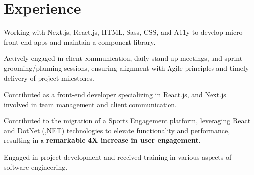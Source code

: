 \documentclass[letterpaper]{deedy-resume} %
\begin{document}
\hfill
%
%
\begin{minipage}[t]{0.66\textwidth} %


\section{Experience}


\vspace{\topsep} %
\begin{tightitemize}
\item Working with Next.js, React.js, HTML, Sass, CSS, and A11y to develop micro front-end apps and maintain a component library.
\item Actively engaged in client communication, daily stand-up meetings, and sprint grooming/planning sessions, ensuring alignment with Agile principles and timely delivery of project milestones.
\end{tightitemize}

\sectionspace %


\begin{tightitemize}
\item Contributed as a front-end developer specializing in React.js, and Next.js involved in team management and client communication.
\item  Contributed to the migration of a Sports Engagement platform, leveraging React and DotNet (,NET) technologies to elevate functionality and performance,
resulting in a \textbf{remarkable 4X increase in user engagement}.
\end{tightitemize}

\sectionspace %


\begin{tightitemize}
\item Engaged in project development and received training in various aspects of software engineering.
\end{tightitemize}


\end{minipage}
\end{document}
